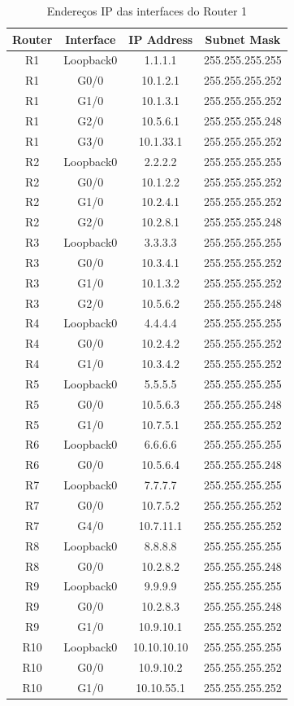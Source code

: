 \documentclass[11pt,english, openright, oneside]{book}
\begin{document}
\begin{table}[H]
\centering
\begin{tabular}{|c|c|c|c|}
\hline
\textbf{Router} & \textbf{Interface} & \textbf{IP Address} & \textbf{Subnet Mask} \\ \hline
R1 & Loopback0 & 1.1.1.1 & 255.255.255.255 \\ \hline
R1 & G0/0 & 10.1.2.1 & 255.255.255.252 \\ \hline
R1 & G1/0 & 10.1.3.1 & 255.255.255.252 \\ \hline
R1 & G2/0 & 10.5.6.1 & 255.255.255.248 \\ \hline
R1 & G3/0 & 10.1.33.1 & 255.255.255.252 \\ \hline
R2 & Loopback0 & 2.2.2.2 & 255.255.255.255 \\ \hline
R2 & G0/0 & 10.1.2.2 & 255.255.255.252 \\ \hline
R2 & G1/0 & 10.2.4.1 & 255.255.255.252 \\ \hline
R2 & G2/0 & 10.2.8.1 & 255.255.255.248 \\ \hline
R3 & Loopback0 & 3.3.3.3 & 255.255.255.255 \\ \hline
R3 & G0/0 & 10.3.4.1 & 255.255.255.252 \\ \hline
R3 & G1/0 & 10.1.3.2 & 255.255.255.252 \\ \hline
R3 & G2/0 & 10.5.6.2 & 255.255.255.248 \\ \hline
R4 & Loopback0 & 4.4.4.4 & 255.255.255.255 \\ \hline
R4 & G0/0 & 10.2.4.2 & 255.255.255.252 \\ \hline
R4 & G1/0 & 10.3.4.2 & 255.255.255.252 \\ \hline
R5 & Loopback0 & 5.5.5.5 & 255.255.255.255 \\ \hline
R5 & G0/0 & 10.5.6.3 & 255.255.255.248 \\ \hline
R5 & G1/0 & 10.7.5.1 & 255.255.255.252 \\ \hline
R6 & Loopback0 & 6.6.6.6 & 255.255.255.255 \\ \hline
R6 & G0/0 & 10.5.6.4 & 255.255.255.248 \\ \hline
R7 & Loopback0 & 7.7.7.7 & 255.255.255.255 \\ \hline
R7 & G0/0 & 10.7.5.2 & 255.255.255.252 \\ \hline
R7 & G4/0 & 10.7.11.1 & 255.255.255.252 \\ \hline
R8 & Loopback0 & 8.8.8.8 & 255.255.255.255 \\ \hline
R8 & G0/0 & 10.2.8.2 & 255.255.255.248 \\ \hline
R9 & Loopback0 & 9.9.9.9 & 255.255.255.255 \\ \hline
R9 & G0/0 & 10.2.8.3 & 255.255.255.248 \\ \hline
R9 & G1/0 & 10.9.10.1 & 255.255.255.252 \\ \hline
R10 & Loopback0 & 10.10.10.10 & 255.255.255.255 \\ \hline
R10 & G0/0 & 10.9.10.2 & 255.255.255.252 \\ \hline
R10 & G1/0 & 10.10.55.1 & 255.255.255.252 \\ \hline
\end{tabular}
\caption{Endereços IP das interfaces do Router 1}
\label{tab:ip1}
\end{table}
\end{document}

